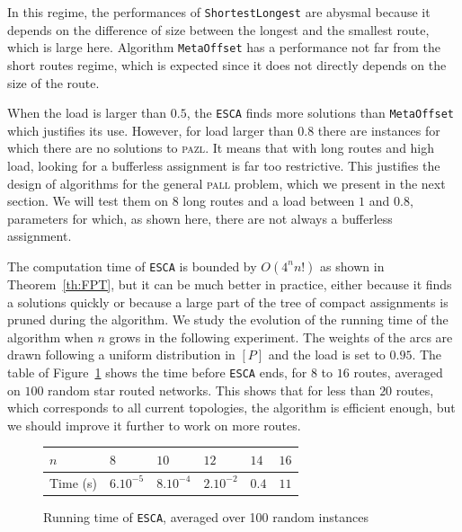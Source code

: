 \documentclass[a4paper,10pt]{journal}
\newcommand\shortestlongest{\texttt{ShortestLongest}\xspace}
\newcommand\metaoffset{\texttt{MetaOffset}\xspace}
\newcommand\ESCA{\texttt{ESCA}\xspace}
\newcommand\pazl{\textsc{pazl}\xspace}
\newcommand\pall{\textsc{pall}\xspace}
\begin{document}
In this regime, the performances of \shortestlongest are abysmal because it depends on the difference of size between the longest and the smallest route, which is large here.  Algorithm \metaoffset has a performance not far from the short routes regime, which is expected since it does not directly depends on the size of the route. 
      
       When the load is larger than $0.5$, the \ESCA finds more solutions than \metaoffset which justifies its use. However, for load larger than $0.8$ there are instances for which there are no solutions to \pazl. It means that with long routes and high load, looking for a bufferless assignment is far too restrictive. This justifies the design of algorithms for the general \pall problem, which we present in the next section. We will test them on $8$ long routes and a load between $1$ and $0.8$, parameters for which, as shown here, there are not always a bufferless assignment.
      
       The computation time of \ESCA is bounded by $O(4^nn!)$ as shown in Theorem~\ref{th:FPT}, but it can be much better in practice, either because it finds a solutions quickly or because a large part of the tree of compact assignments is pruned during the algorithm. We study the evolution of the running time  of the algorithm when $n$ grows in the following experiment. The weights of the arcs are drawn following a uniform distribution in $[P]$ and the load is set to $0.95$.  The table of Figure~\ref{fig:table} shows the time before \ESCA ends, for $8$ to $16$ routes, averaged on $100$ random star routed networks. This shows that for less than $20$ routes, which corresponds to all current topologies, the algorithm is efficient enough, but we should improve it further to work on more routes.
       
             \begin{figure}[h]
         \begin{center}
         \begin{tabularx}{0.9\textwidth}{|l|X|X|X|X|X|}
    \hline
   $n$ & $8$ & $10$& $12$&$14$& $16$\\
    \hline
   Time (s) & $6.10^{-5}$&$8.10^{-4}$&$2.10^{-2}$& $0.4$& $11$\\
    \hline
      \end{tabularx}
      \end{center}
      \caption{Running time of \ESCA, averaged over 100 random instances}
      \label{fig:table}
      \end{figure}
      
\end{document}
